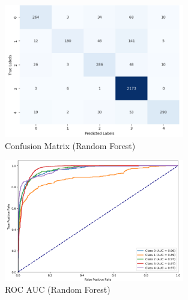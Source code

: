 \vspace{0.25em}

\begin{figure}[h!]  
    \centering
    \includegraphics[width=0.7\textwidth]{Images/RF Confusion Matrix.png}  
    \caption{Confusion Matrix (Random Forest)}
    \label{RFCM}  %
\end{figure}

\begin{figure}[h!]  
    \centering
    \includegraphics[width=0.7\textwidth]{Images/RF ROC.png}  
    \caption{ROC AUC (Random Forest)}
    \label{RFROC}  %
\end{figure}

